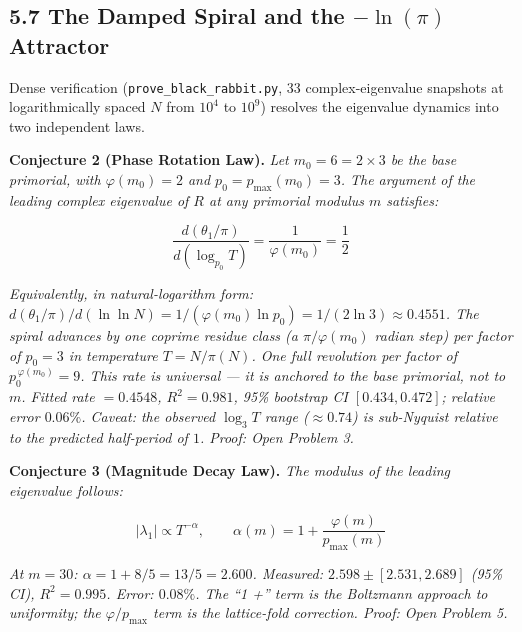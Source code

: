 \documentclass[
  11pt,
]{article}
\numberwithin{equation}{section}
\begin{document}
\subsection{\texorpdfstring{5.7 The Damped Spiral and the
\(-\ln(\pi)\)
Attractor}{5.7 The Damped Spiral and the -\textbackslash ln(\textbackslash pi) Attractor}}\label{the-damped-spiral-and-the--lnpi-attractor}

Dense verification (\texttt{prove\_black\_rabbit.py}, 33
complex-eigenvalue snapshots at logarithmically spaced \(N\) from
\(10^4\) to \(10^9\)) resolves the eigenvalue dynamics into two
independent laws.

\textbf{Conjecture 2 (Phase Rotation Law).} \emph{Let
\(m_0 = 6 = 2 \times 3\) be the base primorial, with
\(\varphi(m_0) = 2\) and \(p_0 = p_{\max}(m_0) = 3\). The argument of
the leading complex eigenvalue of \(R\) at any primorial modulus \(m\)
satisfies:}

\begin{equation}\boxed{\frac{d(\theta_1/\pi)}{d(\log_{p_0} T)} = \frac{1}{\varphi(m_0)} = \frac{1}{2}}\end{equation}

\emph{Equivalently, in natural-logarithm form:
\(d(\theta_1/\pi)/d(\ln\ln N) = 1/(\varphi(m_0) \ln p_0) = 1/(2\ln 3) \approx 0.4551\).
The spiral advances by one coprime residue class (a \(\pi/\varphi(m_0)\)
radian step) per factor of \(p_0 = 3\) in temperature \(T = N/\pi(N)\).
One full revolution per factor of \(p_0^{\,\varphi(m_0)} = 9\). This
rate is universal --- it is anchored to the base primorial, not to
\(m\). Fitted rate \(= 0.4548\), \(R^2 = 0.981\), 95\% bootstrap CI
\([0.434, 0.472]\); relative error \(0.06\%\). Caveat: the observed
\(\log_3 T\) range (\(\approx 0.74\)) is sub-Nyquist relative to the
predicted half-period of \(1\). Proof: Open Problem 3.}

\textbf{Conjecture 3 (Magnitude Decay Law).} \emph{The modulus of the
leading eigenvalue follows:}

\begin{equation}\boxed{|\lambda_1| \propto T^{-\alpha}, \qquad \alpha(m) = 1 + \frac{\varphi(m)}{p_{\max}(m)}}\end{equation}

\emph{At \(m = 30\): \(\alpha = 1 + 8/5 = 13/5 = 2.600\). Measured:
\(2.598 \pm [2.531, 2.689]\) (95\% CI), \(R^2 = 0.995\). Error:
\(0.08\%\). The ``1 +'' term is the Boltzmann approach to uniformity;
the \(\varphi/p_{\max}\) term is the lattice-fold correction. Proof:
Open Problem 5.}
\end{document}
